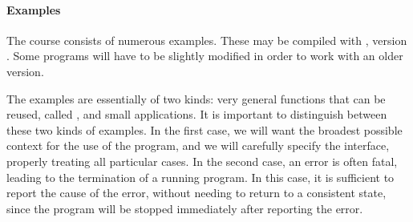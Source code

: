 \paragraph{Examples}

The course consists of numerous examples. These may be compiled with 
{\ocaml}, version {\ocamlversion}.  Some programs will have to be
slightly modified in order to work with an older version. 

The examples are essentially of two kinds: very general functions that can
be reused, called , and small
applications. It is important to distinguish between these two kinds
of examples. In the first case, we will want the broadest possible context
for the use of the program, and we will carefully specify the
interface, properly treating all particular cases.  In the second
case, an error is often fatal, leading to the termination of a running program. In this
case, it is sufficient to report the cause of the error, without
needing to return to a consistent state, since the program will be
stopped immediately after reporting the error.
